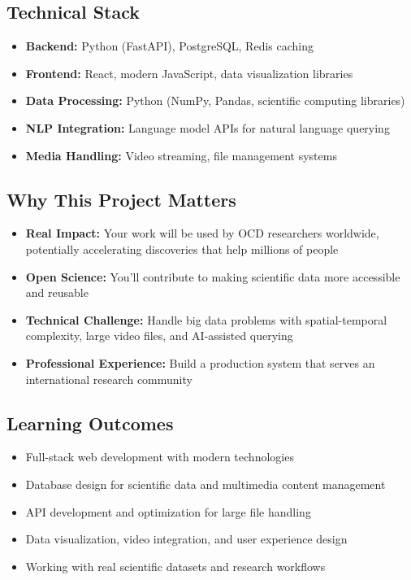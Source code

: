 \documentclass[12pt]{article}
\begin{document}
\subsection*{Technical Stack}
\begin{itemize}
    \item \textbf{Backend:} Python (FastAPI), PostgreSQL, Redis caching
    \item \textbf{Frontend:} React, modern JavaScript, data visualization libraries
    \item \textbf{Data Processing:} Python (NumPy, Pandas, scientific computing libraries)
    \item \textbf{NLP Integration:} Language model APIs for natural language querying
    \item \textbf{Media Handling:} Video streaming, file management systems
\end{itemize}

\subsection*{Why This Project Matters}
\begin{itemize}
    \item \textbf{Real Impact:} Your work will be used by OCD researchers worldwide, potentially accelerating discoveries that help millions of people
    \item \textbf{Open Science:} You’ll contribute to making scientific data more accessible and reusable
    \item \textbf{Technical Challenge:} Handle big data problems with spatial-temporal complexity, large video files, and AI-assisted querying
    \item \textbf{Professional Experience:} Build a production system that serves an international research community
\end{itemize}

\subsection*{Learning Outcomes}
\begin{itemize}
    \item Full-stack web development with modern technologies
    \item Database design for scientific data and multimedia content management
    \item API development and optimization for large file handling
    \item Data visualization, video integration, and user experience design
    \item Working with real scientific datasets and research workflows
\end{itemize}
\end{document}
